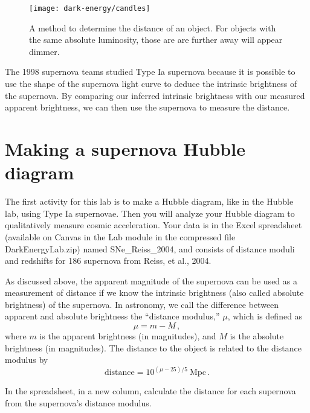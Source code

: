 \begin{figure}
	\centering
	\texttt{[image: dark-energy/candles]}
	\caption{A method to determine the distance of an object. For objects with the same absolute luminosity, those are are further away will appear dimmer.}\label{de:fig:candles}
\end{figure}

The 1998 supernova teams studied Type Ia supernova because it is
possible to use the shape of the supernova light curve to deduce the
intrinsic brightness of the supernova. By comparing our inferred
intrinsic brightness with our measured apparent brightness, we can
then use the supernova to measure the distance.

\section{Making a supernova Hubble diagram}

The first activity for this lab is to make a Hubble diagram, like in the
Hubble lab, using Type Ia supernovae. Then you will analyze your Hubble diagram to qualitatively measure cosmic acceleration. Your data is in the Excel spreadsheet (available on Canvas in the Lab module in the compressed file DarkEnergyLab.zip) named SNe\_Reiss\_2004, and consists of distance moduli
and redshifts for 186 supernova from Reiss, et al., 2004.

As discussed above, the apparent magnitude of the supernova can be
used as a measurement of distance if we know the intrinsic brightness
(also called absolute brightness) of the supernova. In astronomy, we call
the difference between apparent and absolute brightness the “distance
modulus,” $\mu$, which is defined as
\begin{equation}
\mu = m - M \,,
\end{equation}
where $m$ is the apparent brightness (in
magnitudes), and $M$ is the absolute brightness (in magnitudes). The
distance to the object is related to the distance modulus by
\begin{equation}
 \textrm{distance} = 10^{(\mu-25)/5}\:\textrm{Mpc} \,.
\end{equation}

\begin{steps}
	\item In the spreadsheet, in a new column, calculate the distance for each supernova from the supernova’s
	distance modulus.
\end{steps}

